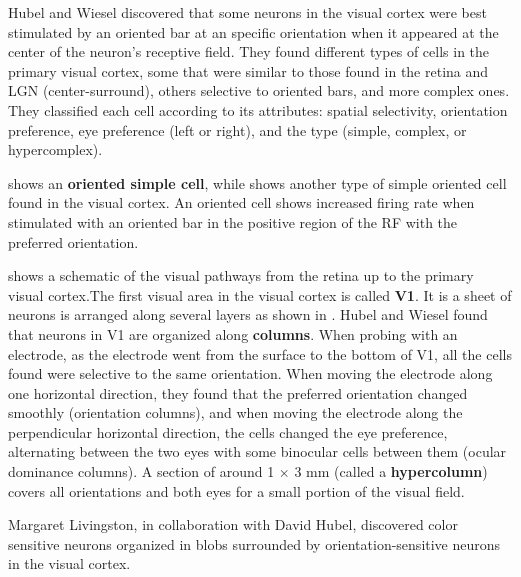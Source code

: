 Hubel and Wiesel discovered that some neurons in the visual cortex were best stimulated by an oriented bar at an specific orientation when it appeared at the center of the neuron's receptive field. They found different types of cells in the primary visual cortex, some that were similar to those found in the retina and LGN (center-surround), others selective to oriented bars, and more complex ones.
They classified each cell according to its attributes: spatial selectivity, orientation preference, eye preference (left or right), and the type (simple, complex, or hypercomplex).

 shows an {\bf oriented simple cell}, while  shows another type of simple oriented cell found in the visual cortex. An oriented cell shows increased firing rate when stimulated with an oriented bar in the positive region of the RF with the preferred orientation.

\Fig{\ref{fig:visual_pathways}}
shows a schematic of the visual pathways from the retina up to the primary visual cortex.The first visual area in the visual cortex is called {\bf V1}. It is a sheet of neurons is arranged along several layers as shown in \fig{\ref{fig:visual_pathways}}. %
Hubel and Wiesel found that neurons in V1 are organized along {\bf columns}. When probing with an electrode, as the electrode went from the surface to the bottom of V1, all the cells found were selective to the same orientation. When moving the electrode along one horizontal direction, they found that the preferred orientation changed smoothly (orientation columns), and when moving the electrode along the perpendicular horizontal direction, the cells changed the eye preference, alternating between the two eyes with some binocular cells between them (ocular dominance columns). A section of around 1 $\times$ 3 mm (called a {\bf hypercolumn}) 
covers all orientations and both eyes for a small portion of the visual field.  

Margaret Livingston, in collaboration with David Hubel, discovered color sensitive neurons \cite{Livingstone1984AnatomyAP} organized in blobs surrounded by orientation-sensitive neurons in the visual cortex.  


